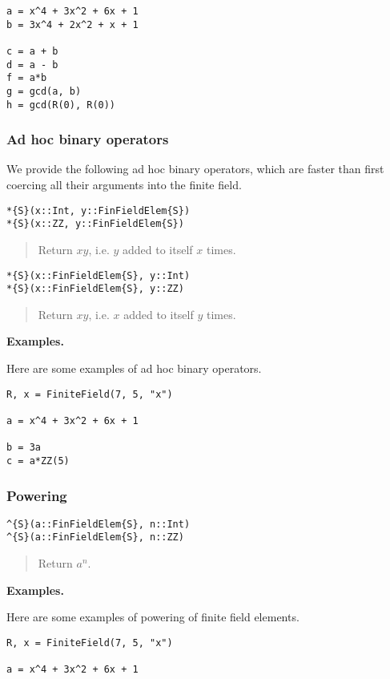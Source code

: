 \documentclass[a4paper,10pt]{article}
\newcommand{\desc}[1]{\vspace{-3mm}\begin{quote}#1\end{quote}}
\begin{document}
{{\begin{lstlisting}
a = x^4 + 3x^2 + 6x + 1
b = 3x^4 + 2x^2 + x + 1

c = a + b
d = a - b
f = a*b
g = gcd(a, b)
h = gcd(R(0), R(0))
\end{lstlisting}

\subsubsection{Ad hoc binary operators}

We provide the following ad hoc binary operators, which are faster than first
coercing all their arguments into the finite field.

\begin{lstlisting}
*{S}(x::Int, y::FinFieldElem{S})
*{S}(x::ZZ, y::FinFieldElem{S})
\end{lstlisting}

\desc{Return $xy$, i.e. $y$ added to itself $x$ times.}

\begin{lstlisting}
*{S}(x::FinFieldElem{S}, y::Int)
*{S}(x::FinFieldElem{S}, y::ZZ)
\end{lstlisting}

\desc{Return $xy$, i.e. $x$ added to itself $y$ times.}

\textbf{Examples.}

Here are some examples of ad hoc binary operators.

\begin{lstlisting}
R, x = FiniteField(7, 5, "x")

a = x^4 + 3x^2 + 6x + 1

b = 3a
c = a*ZZ(5)
\end{lstlisting}

\subsubsection{Powering}

\begin{lstlisting}
^{S}(a::FinFieldElem{S}, n::Int)
^{S}(a::FinFieldElem{S}, n::ZZ)
\end{lstlisting}

\desc{Return $a^n$.}

\textbf{Examples.}

Here are some examples of powering of finite field elements.

\begin{lstlisting}
R, x = FiniteField(7, 5, "x")

a = x^4 + 3x^2 + 6x + 1


\end{lstlisting}}}
\end{document}
